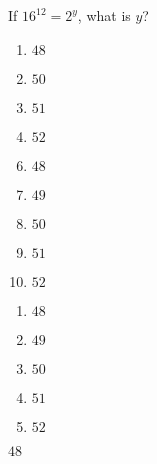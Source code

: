 

  If $16^{12} = 2^y$, what is $y$?\\


\ifsat
	\begin{enumerate}[label=\Alph*)]
		\item   $48$%
		\item  $50$
		\item  $51$
		\item   $52$
	\end{enumerate}
\else
\fi

\ifacteven
	\begin{enumerate}[label=\textbf{\Alph*.},itemsep=\fill,align=left]
		\setcounter{enumii}{5}
		\item   $48$%
		\item  $49$
		\item  $50$
		\addtocounter{enumii}{1}
		\item  $51$
		\item   $52$
	\end{enumerate}
\else
\fi

\ifactodd
	\begin{enumerate}[label=\textbf{\Alph*.},itemsep=\fill,align=left]
		\item   $48$%
		\item  $49$
		\item  $50$
		\item  $51$
		\item   $52$
	\end{enumerate}
\else
\fi

\ifgridin
   $48$%
		
\else
\fi

